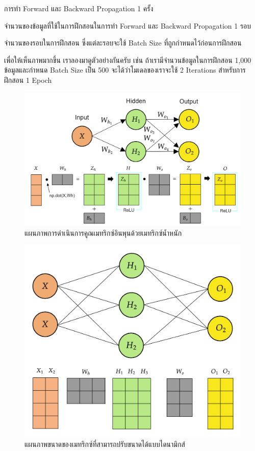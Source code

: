 \begin{description}[font=$\bullet$~\normalfont\scshape\bfseries\color{red!50!black}]
    \item[1 Epoch] การทำ Forward และ Backward Propagation 1 ครั้ง
    
    \item[Batch Size] จำนวนของข้อมูลที่ใช้ในการฝึกสอนในการทำ Forward และ Backward Propagation 1 รอบ
    
    \item[Iteration] จำนวนของรอบในการฝึกสอน ซึ่งแต่ละรอบจะใช้ Batch Size ที่ถูกกำหนดไว้ก่อนการฝึกสอน
\end{description}

เพื่อให้เห็นภาพมากขึ้น เราลองมาดูตัวอย่างกันครับ เช่น ถ้าเรามีจำนวนข้อมูลในการฝึกสอน 1,000 ข้อมูลและกำหนด Batch Size เป็น 500 
จะได้ว่าโมเดลของเราจะใช้ 2 Iterations สำหรับการฝึกสอน 1 Epoch

\begin{figure}[H]
    \centering
    \includegraphics[width=0.9\linewidth]{fig/nn_feedforward_matrices.png}
    \caption{แผนภาพการดำเนินการคูณเมทริกซ์อินพุนด้วยเมทริกซ์น้ำหนัก}
    \label{fig:nn_ff_mat}
\end{figure}

\begin{figure}[H]
    \centering
    \includegraphics[width=0.8\linewidth]{fig/nn_feedforward_dyn_resizing.png}
    \caption{แผนภาพขนาดของเมทริกซ์ที่สามารถปรับขนาดได้แบบไดนามิกส์}
    \label{fig:nn_ff_dyn_resize}
\end{figure}

